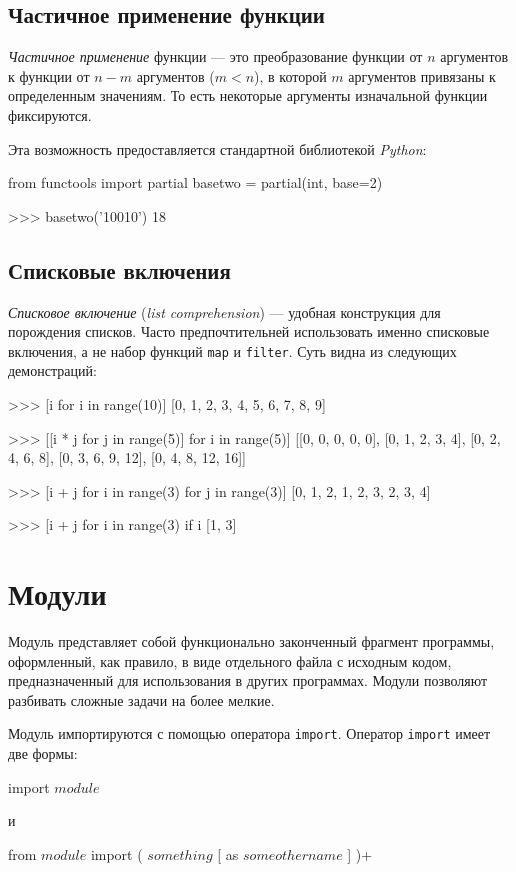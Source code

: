 \subsection{Частичное применение функции}
\emph{Частичное применение} функции — это преобразование функции от $n$ аргументов к функции от $n - m$ аргументов ($m < n$), в которой $m$ аргументов привязаны к определенным значениям. То есть некоторые аргументы изначальной функции фиксируются.

Эта возможность предоставляется стандартной библиотекой \emph{Python}:
\begin{pylst}{}{}
from functools import partial
basetwo = partial(int, base=2)

>>> basetwo('10010')
18
\end{pylst}

\subsection{Списковые включения}
\emph{Списковое включение} (\emph{list comprehension}) — удобная конструкция для порождения списков. Часто предпочтительней использовать именно списковые включения, а не набор функций \lstinline{map} и \lstinline{filter}. Суть видна из следующих демонстраций:

\begin{pylst}{}{}
>>> [i for i in range(10)]
[0, 1, 2, 3, 4, 5, 6, 7, 8, 9]

>>> [[i * j for j in range(5)] for i in range(5)]
[[0, 0, 0, 0, 0],
 [0, 1, 2, 3, 4],
 [0, 2, 4, 6, 8],
 [0, 3, 6, 9, 12],
 [0, 4, 8, 12, 16]]

>>> [i + j for i in range(3) for j in range(3)]
[0, 1, 2, 1, 2, 3, 2, 3, 4]

>>> [i + j for i in range(3) if i %
[1, 3]
\end{pylst}

\section{Модули}
\label{sec:py-modules}
Модуль представляет собой функционально законченный фрагмент программы, оформленный, как правило, в виде отдельного файла с исходным кодом, предназначенный для использования в других программах. Модули позволяют разбивать сложные задачи на более мелкие.

Модуль импортируются с помощью оператора \lstinline{import}. Оператор \lstinline{import} имеет две формы:
\begin{pylst}{}{}
import $module$
\end{pylst}
и
\begin{pylst}{}{}
from $module$ import ( $something$ [ as $someothername$ ] )+
\end{pylst}

